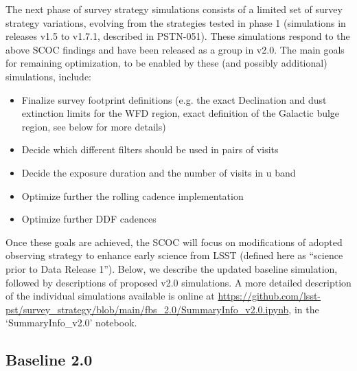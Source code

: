 The next phase of survey strategy simulations consists of a limited set of survey strategy variations, evolving from the strategies tested in phase 1 (simulations in releases v1.5 to v1.7.1, described in PSTN-051). These simulations respond to the above SCOC findings and have been released as a group in v2.0. The main goals for remaining optimization, to be enabled by these (and possibly additional) simulations,  include:
\begin{itemize}
\item{Finalize survey footprint definitions (e.g. the exact Declination and dust extinction 
            limits for  the WFD region, exact definition of the Galactic bulge region, see below for 
            more details)}
\item{Decide which different filters should be used in pairs of visits}
\item{Decide the exposure duration and the number of visits in u band }
\item{Optimize further the rolling cadence implementation }
\item{Optimize further DDF cadences }
\end{itemize}

Once these goals are achieved, the SCOC will focus on modifications of adopted observing strategy to enhance early science from LSST (defined here as ``science prior to Data Release 1''). Below, we describe the updated baseline simulation, followed by descriptions of proposed v2.0 simulations. A more detailed description of the individual simulations available is online at \url{https://github.com/lsst-pst/survey_strategy/blob/main/fbs_2.0/SummaryInfo_v2.0.ipynb}, in the `SummaryInfo\_v2.0' notebook. 

\subsection{Baseline 2.0}

